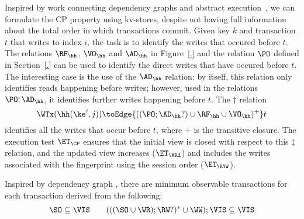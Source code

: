 Inspired by work connecting dependency graphs and abstract execution~\cite{..}, we can formulate the CP property using kv-stores, despite not having
full information about the total order in which transactions commit.
Given key $k$ and transaction $t$ that writes to index $i$, the task
is to identify the writes that occured before $t$. The relations
$\RF_{\hh}$, $\VO_{\hh}$ and $\AD_{\hh} $ in Figure~\ref{.} and the
relation $\PO$ defined in Section~\ref{.}  can be used to identify
the direct writes that have occured before $t$. The interesting
case is the use of the $\AD_{\hh}$ relation: by itself, this relation
only identifies reads happening before writes; however, used in the
relations $\PO ;
\AD_{\hh}$, it identifies further  writes happening
before $t$. The $\dagger$ relation
\[
\WTx(\hh(\ke', j)) \toEdge{((\PO ; \AD_{\hh}? )\cup \RF_{\hh} \cup \VO_{\hh})^{+}} t
\]
identifies all the writes that occur before $t$, where $+$ is the
transitive closure. 
The execution test $\ET_{\CP}$ ensures that the initial view is 
closed with respect to this $\ddagger$  relation, and the updated view 
increases ($ \ET_\MRd $) and 
includes the writes associated with the fingerprint using the
session order ($\ET_\RYW $).





Inspired by dependency graph \cite{.....},
there are minimum observable transactions for each transaction derived from the following:
\[
    \SO  \subseteq  \VIS \qquad
    ( ( ( \SO \cup \WR ) ; \RW? )^* \cup \WW ) ; \VIS \subseteq \VIS
\]

